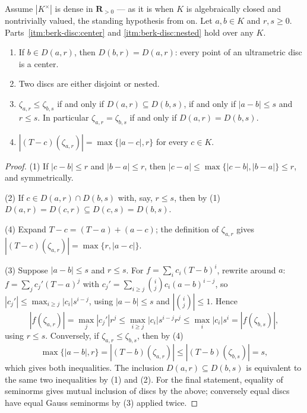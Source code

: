 \begin{lemma}\label{lem:berk-disc-combinatorics}
Assume $|K^\times|$ is dense in $\mathbf R_{>0}$ --- as it is when
$K$ is algebraically closed and nontrivially valued, the standing
hypothesis from  on.  Let $a,b\in K$ and
$r,s\geq0$.  Parts~\cref{itm:berk-disc:center} and
\cref{itm:berk-disc:nested} hold over any $K$.
\begin{enumerate}
\item\label{itm:berk-disc:center} If $b\in D(a,r)$, then
      $D(b,r)=D(a,r)$: every point of an
      ultrametric disc is a center.
\item\label{itm:berk-disc:nested} Two discs are either disjoint or nested.
\item $\zeta_{a,r}\leq\zeta_{b,s}$ if and only if
      $D(a,r)\subseteq D(b,s)$, if and only if $|a-b|\leq s$ and
      $r\leq s$.  In particular $\zeta_{a,r}=\zeta_{b,s}$ if and
      only if $D(a,r)=D(b,s)$.
\item $|(T-c)(\zeta_{a,r})|=\max\{|a-c|,r\}$ for every $c\in K$.
\end{enumerate}
\end{lemma}

\begin{proof}
(1) If $|c-b|\leq r$ and $|b-a|\leq r$, then
$|c-a|\leq\max\{|c-b|,|b-a|\}\leq r$, and symmetrically.

(2) If $c\in D(a,r)\cap D(b,s)$ with, say, $r\leq s$, then by (1)
$D(a,r)=D(c,r)\subseteq D(c,s)=D(b,s)$.

(4) Expand $T-c=(T-a)+(a-c)$; the definition of $\zeta_{a,r}$ gives
$|(T-c)(\zeta_{a,r})|=\max\{r,|a-c|\}$.

(3) Suppose $|a-b|\leq s$ and $r\leq s$.  For
$f=\sum_ic_i(T-b)^i$, rewrite around $a$:
$f=\sum_jc_j'(T-a)^j$ with
$c_j'=\sum_{i\geq j}\binom{i}{j}c_i(a-b)^{i-j}$, so
$|c_j'|\leq\max_{i\geq j}|c_i|s^{i-j}$, using $|a-b|\le s$ and
$|\binom ij|\le1$.  Hence
\[
 |f(\zeta_{a,r})|=\max_j|c_j'|r^j
 \leq\max_{i\geq j}|c_i|s^{i-j}r^j
 \leq\max_i|c_i|s^i=|f(\zeta_{b,s})|,
\]
using $r\leq s$.  Conversely, if $\zeta_{a,r}\leq\zeta_{b,s}$, then
by (4)
\[
 \max\{|a-b|,r\}=|(T-b)(\zeta_{a,r})|\leq|(T-b)(\zeta_{b,s})|=s,
\]
which gives both inequalities.  The inclusion
$D(a,r)\subseteq D(b,s)$ is equivalent to the same two inequalities by
(1) and (2).  For the final statement, equality of seminorms gives
mutual inclusion of discs by the above; conversely equal discs have
equal Gauss seminorms by (3) applied twice.
\end{proof}

